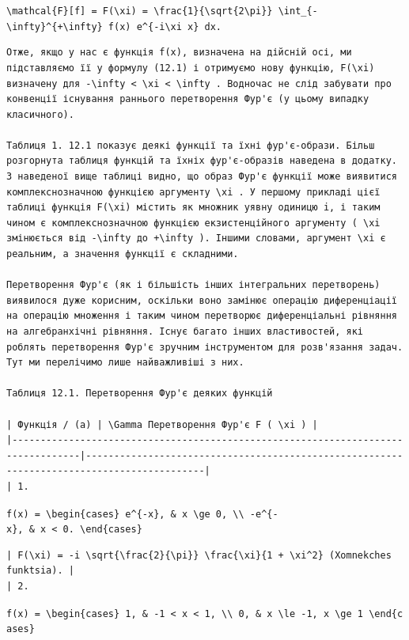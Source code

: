 \documentclass[
  ukrainian,
]{article}
\begin{document}
\texttt{\textbackslash{}mathcal\{F\}{[}f{]}\ =\ F(\textbackslash{}xi)\ =\ \textbackslash{}frac\{1\}\{\textbackslash{}sqrt\{2\textbackslash{}pi\}\}\ \textbackslash{}int\_\{-\textbackslash{}infty\}\^{}\{+\textbackslash{}infty\}\ f(x)\ e\^{}\{-i\textbackslash{}xi\ x\}\ dx.}

\begin{verbatim}
Отже, якщо у нас є функція f(x), визначена на дійсній осі, ми підставляємо її у формулу (12.1) і отримуємо нову функцію, F(\xi) визначену для -\infty < \xi < \infty . Водночас не слід забувати про конвенції існування раннього перетворення Фур'є (у цьому випадку класичного).

Таблиця 1. 12.1 показує деякі функції та їхні фур'є-образи. Більш розгорнута таблиця функцій та їхніх фур'є-образів наведена в додатку. З наведеної вище таблиці видно, що образ Фур'є функції може виявитися комплекснозначною функцією аргументу \xi . У першому прикладі цієї таблиці функція F(\xi) містить як множник уявну одиницю i, і таким чином є комплекснозначною функцією екзистенційного аргументу ( \xi змінюється від -\infty до +\infty ). Іншими словами, аргумент \xi є реальним, а значення функції є складними.

Перетворення Фур'є (як і більшість інших інтегральних перетворень) виявилося дуже корисним, оскільки воно замінює операцію диференціації на операцію множення і таким чином перетворює диференціальні рівняння на алгебранхічні рівняння. Існує багато інших властивостей, які роблять перетворення Фур'є зручним інструментом для розв'язання задач. Тут ми перелічимо лише найважливіші з них.

Таблиця 12.1. Перетворення Фур'є деяких функцій

| Функція / (a) | \Gamma Перетворення Фур'є F ( \xi ) |
|----------------------------------------------------------------------------------|-------------------------------------------------------------------------------------------|
| 1.
\end{verbatim}

\texttt{f(x)\ =\ \textbackslash{}begin\{cases\}\ e\^{}\{-x\},\ \&\ x\ \textbackslash{}ge\ 0,\ \textbackslash{}\textbackslash{}\ -e\^{}\{-x\},\ \&\ x\ \textless{}\ 0.\ \textbackslash{}end\{cases\}}

\begin{verbatim}
| F(\xi) = -i \sqrt{\frac{2}{\pi}} \frac{\xi}{1 + \xi^2} (Xomnekches funktsia). |
| 2.
\end{verbatim}

\texttt{f(x)\ =\ \textbackslash{}begin\{cases\}\ 1,\ \&\ -1\ \textless{}\ x\ \textless{}\ 1,\ \textbackslash{}\textbackslash{}\ 0,\ \&\ x\ \textbackslash{}le\ -1,\ x\ \textbackslash{}ge\ 1\ \textbackslash{}end\{cases\}}
\end{document}
